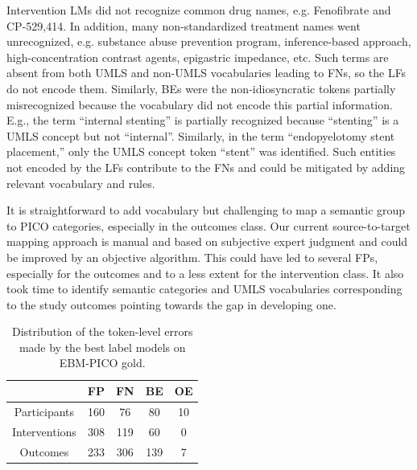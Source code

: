 \documentclass[10.7pt,]{article}
\begin{document}
Intervention LMs did not recognize common drug names, e.g. Fenofibrate and CP-529,414.
In addition, many non-standardized treatment names went unrecognized, e.g. substance abuse prevention program, inference-based approach, high-concentration contrast agents, epigastric impedance, etc.
Such terms are absent from both UMLS and non-UMLS vocabularies leading to FNs, so the LFs do not encode them.
Similarly, BEs were the non-idiosyncratic tokens partially misrecognized because the vocabulary did not encode this partial information.
E.g., the term ``internal stenting'' is partially recognized because ``stenting'' is a UMLS concept but not ``internal''.
Similarly, in the term ``endopyelotomy stent placement,'' only the UMLS concept token ``stent'' was identified.
Such entities not encoded by the LFs contribute to the FNs and could be mitigated by adding relevant vocabulary and rules.\cite{augenstein2017generalisation}

It is straightforward to add vocabulary but challenging to map a semantic group to PICO categories, especially in the outcomes class.
Our current source-to-target mapping approach is manual and based on subjective expert judgment and could be improved by an objective algorithm.
This could have led to several FPs, especially for the outcomes and to a less extent for the intervention class.
It also took time to identify semantic categories and UMLS vocabularies corresponding to the study outcomes pointing towards the gap in developing one.
%
\begin{table}[h!]
\begin{center}
\begin{tabular}{| c | c | c | c | c |} 
\hline
 & FP & FN & BE & OE \\ 
\hline
Participants & 160 & 76 & 80 & 10 \\ 
Interventions & 308 & 119 & 60 & 0 \\ 
Outcomes & 233 & 306 & 139 & 7 \\ 
\hline
\end{tabular}
\caption{\label{tab:error_ner} Distribution of the token-level errors made by the best label models on EBM-PICO gold.}
\end{center}
\end{table}
%
%
%
\end{document}
